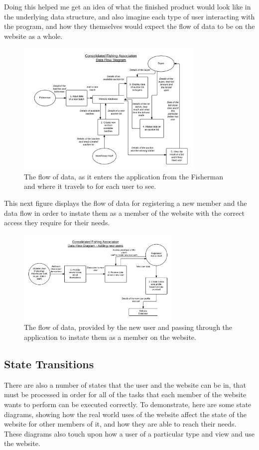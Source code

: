 \documentclass{article}
\begin{document}
Doing this helped me get an idea of what the finished product would look like in the underlying data structure, and also imagine each type of user interacting with the program, and how they themselves would expect the flow of data to be on the website as a whole.
\begin{figure}[H]
	\centering
	\includegraphics[width=0.8\textwidth]{img/TA-DFD-Transaction.png}
	\caption{The flow of data, as it enters the application from the Fisherman and where it travels to for each user to see.}
\end{figure}
This next figure displays the flow of data for registering a new member and the data flow in order to instate them as a member of the website with the correct access they require for their needs.
\begin{figure}[H]
	\centering
	\includegraphics[width=0.7\textwidth]{img/TA-DFD-User.png}
	\caption{The flow of data, provided by the new user and passing through the application to instate them as a member on the website.}
\end{figure}

\subsection{State Transitions}
There are also a number of states that the user and the website can be in, that must be processed in order for all of the tasks that each member of the website wants to perform can be executed correctly. To demonstrate, here are some state diagrams, showing how the real world uses of the website affect the state of the website for other members of it, and how they are able to reach their needs. These diagrams also touch upon how a user of a particular type and view and use the website.
\end{document}
